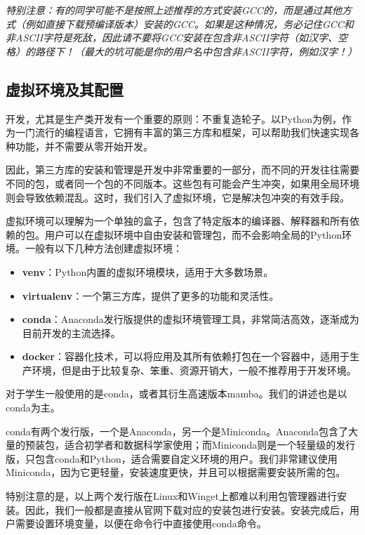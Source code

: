 \documentclass[../main.tex]{subfiles}
\begin{document}
\emph{特别注意：有的同学可能不是按照上述推荐的方式安装GCC的，而是通过其他方式（例如直接下载预编译版本）安装的GCC。如果是这种情况，务必记住GCC和非ASCII字符是死敌，因此请不要将GCC安装在包含非ASCII字符（如汉字、空格）的路径下！（最大的坑可能是你的用户名中包含非ASCII字符，例如汉字！）}

\subsection{虚拟环境及其配置}\label{sec:virtualenv}

开发，尤其是生产类开发有一个重要的原则：不重复造轮子。以Python为例，作为一门流行的编程语言，它拥有丰富的第三方库和框架，可以帮助我们快速实现各种功能，并不需要从零开始开发。

因此，第三方库的安装和管理是开发中非常重要的一部分，而不同的开发往往需要不同的包，或者同一个包的不同版本。这些包有可能会产生冲突，如果用全局环境则会导致依赖混乱。这时，我们引入了虚拟环境，它是解决包冲突的有效手段。

虚拟环境可以理解为一个单独的盒子，包含了特定版本的编译器、解释器和所有依赖的包。用户可以在虚拟环境中自由安装和管理包，而不会影响全局的Python环境。一般有以下几种方法创建虚拟环境：
\begin{itemize}
  \item \textbf{venv}：Python内置的虚拟环境模块，适用于大多数场景。
  \item \textbf{virtualenv}：一个第三方库，提供了更多的功能和灵活性。
  \item \textbf{conda}：Anaconda发行版提供的虚拟环境管理工具，非常简洁高效，逐渐成为目前开发的主流选择。
  \item \textbf{docker}：容器化技术，可以将应用及其所有依赖打包在一个容器中，适用于生产环境，但是由于比较复杂、笨重、资源开销大，一般不推荐用于开发环境。
\end{itemize}

对于学生一般使用的是conda，或者其衍生高速版本mamba。我们的讲述也是以conda为主。

conda有两个发行版，一个是Anaconda，另一个是Miniconda。Anaconda包含了大量的预装包，适合初学者和数据科学家使用；而Miniconda则是一个轻量级的发行版，只包含conda和Python，适合需要自定义环境的用户。我们非常建议使用Miniconda，因为它更轻量，安装速度更快，并且可以根据需要安装所需的包。

特别注意的是，以上两个发行版在Linux和Winget上都难以利用包管理器进行安装。因此，我们一般都是直接从官网下载对应的安装包进行安装。安装完成后，用户需要设置环境变量，以便在命令行中直接使用conda命令。
\end{document}
